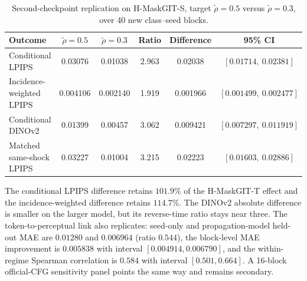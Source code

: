 \documentclass[11pt,a4paper]{article}
\theoremstyle{plain}
\theoremstyle{definition}
\theoremstyle{remark}
\newcommand{\rholabel}{\widetilde{\rho}}
\begin{document}
\begin{table}[t]
\centering
\caption{Second-checkpoint replication on H-MaskGIT-S, target $\rholabel=0.5$ versus
$\rholabel=0.3$, over 40 new class--seed blocks.}
\label{tab:replication}
\small
\begin{tabular}{@{}lccccc@{}}
\toprule
Outcome & $\rholabel=0.5$ & $\rholabel=0.3$ & Ratio & Difference & 95\% CI \\
\midrule
Conditional LPIPS        & 0.03076  & 0.01038  & 2.963 & 0.02038  & $[0.01714,\ 0.02381]$ \\
Incidence-weighted LPIPS & 0.004106 & 0.002140 & 1.919 & 0.001966 & $[0.001499,\ 0.002477]$ \\
Conditional DINOv2       & 0.01399  & 0.00457  & 3.062 & 0.009421 & $[0.007297,\ 0.011919]$ \\
Matched same-shock LPIPS & 0.03227  & 0.01004  & 3.215 & 0.02223  & $[0.01603,\ 0.02886]$ \\
\bottomrule
\end{tabular}
\end{table}

The conditional LPIPS difference retains $101.9\%$ of the H-MaskGIT-T effect and
the incidence-weighted difference retains $114.7\%$. The DINOv2 absolute
difference is smaller on the larger model, but its reverse-time ratio stays near
three. The token-to-perceptual link also replicates: seed-only and propagation-model
held-out MAE are $0.01280$ and $0.006964$ (ratio $0.544$), the block-level MAE
improvement is $0.005838$ with interval $[0.004914,0.006790]$, and the
within-regime Spearman correlation is $0.584$ with interval
$[0.501,0.664]$. A 16-block official-CFG sensitivity
panel points the same way and remains secondary.
\end{document}
